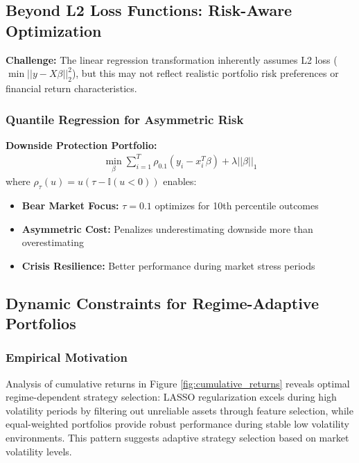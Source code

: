 \documentclass[12pt]{article}
\begin{document}
\subsection{Beyond L2 Loss Functions: Risk-Aware Optimization}

\textbf{Challenge:} The linear regression transformation inherently assumes L2 loss ($\min ||y - X\beta||_2^2$), but this may not reflect realistic portfolio risk preferences or financial return characteristics.

\subsubsection{Quantile Regression for Asymmetric Risk}
\textbf{Downside Protection Portfolio:}
\begin{align}
\min_\beta \sum_{i=1}^T \rho_{0.1}(y_i - x_i^T\beta) + \lambda ||\beta||_1
\end{align}
where $\rho_\tau(u) = u(\tau - \mathbb{I}(u < 0))$ enables:
\begin{itemize}
    \item \textbf{Bear Market Focus:} $\tau = 0.1$ optimizes for 10th percentile outcomes
    \item \textbf{Asymmetric Cost:} Penalizes underestimating downside more than overestimating
    \item \textbf{Crisis Resilience:} Better performance during market stress periods
\end{itemize}

\subsection{Dynamic Constraints for Regime-Adaptive Portfolios}

\subsubsection{Empirical Motivation}
Analysis of cumulative returns in Figure \ref{fig:cumulative_returns} reveals optimal regime-dependent strategy selection: LASSO regularization excels during high volatility periods by filtering out unreliable assets through feature selection, while equal-weighted portfolios provide robust performance during stable low volatility environments. This pattern suggests adaptive strategy selection based on market volatility levels.
\end{document}
